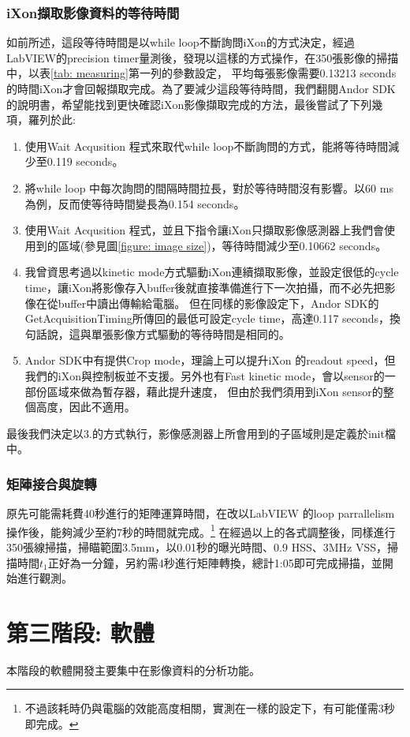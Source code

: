 \documentclass[12pt]{article}
\begin{document}
    \subsubsection{iXon擷取影像資料的等待時間}
    如前所述，這段等待時間是以while loop不斷詢問iXon的方式決定，經過LabVIEW的precision timer量測後，發現以這樣的方式操作，在350張影像的掃描中，以表\ref{tab: measuring}第一列的參數設定，
    平均每張影像需要0.13213 seconds的時間iXon才會回報擷取完成。為了要減少這段等待時間，我們翻閱Andor SDK的說明書，希望能找到更快確認iXon影像擷取完成的方法，最後嘗試了下列幾項，羅列於此:
    \begin{enumerate}
        \item 使用Wait Acqusition 程式來取代while loop不斷詢問的方式，能將等待時間減少至0.119 seconds。
        \item 將while loop 中每次詢問的間隔時間拉長，對於等待時間沒有影響。以60 ms為例，反而使等待時間變長為0.154 seconds。
        \item 使用Wait Acqusition 程式，並且下指令讓iXon只擷取影像感測器上我們會使用到的區域(參見圖\ref{figure: image size})，等待時間減少至0.10662 seconds。
        \item 我曾資思考過以kinetic mode方式驅動iXon連續擷取影像，並設定很低的cycle time，讓iXon將影像存入buffer後就直接準備進行下一次拍攝，而不必先把影像在從buffer中讀出傳輸給電腦。
        但在同樣的影像設定下，Andor SDK的GetAcquisitionTiming所傳回的最低可設定cycle time，高達0.117 seconds，換句話說，這與單張影像方式驅動的等待時間是相同的。
        \item Andor SDK中有提供Crop mode，理論上可以提升iXon 的readout speed，但我們的iXon與控制板並不支援。另外也有Fast kinetic mode，會以sensor的一部份區域來做為暫存器，藉此提升速度，
        但由於我們須用到iXon sensor的整個高度，因此不適用。
    \end{enumerate}
    最後我們決定以3.的方式執行，影像感測器上所會用到的子區域則是定義於init檔中。
    \subsubsection{矩陣接合與旋轉}
    原先可能需耗費40秒進行的矩陣運算時間，在改以LabVIEW 的loop parrallelism操作後，能夠減少至約7秒的時間就完成。\footnote{不過該耗時仍與電腦的效能高度相關，實測在一樣的設定下，有可能僅需3秒即完成。}
    在經過以上的各式調整後，同樣進行350張線掃描，掃瞄範圍3.5mm，以0.01秒的曝光時間、0.9 HSS、3MHz VSS，掃描時間$t_1$正好為一分鐘，另約需4秒進行矩陣轉換，總計1:05即可完成掃描，並開始進行觀測。


    \section{第三階段: 軟體}
    本階段的軟體開發主要集中在影像資料的分析功能。
\end{document}
